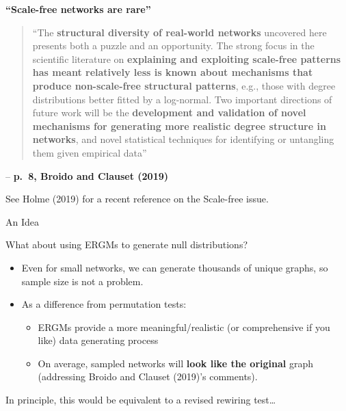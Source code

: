 \documentclass[10pt,ignorenonframetext,aspectratio=169,]{beamer}
\begin{document}
\begin{frame}

\textbf{``Scale-free networks are rare''}

\begin{quote}
\Huge``\normalsize The \textbf{structural diversity of real-world
networks} uncovered here presents both a puzzle and an opportunity. The
strong focus in the scientific literature on \textbf{explaining and
exploiting scale-free patterns has meant relatively less is known about
mechanisms that produce non-scale-free structural patterns}, e.g., those
with degree distributions better fitted by a log-normal. Two important
directions of future work will be the \textbf{development and validation
of novel mechanisms for generating more realistic degree structure in
networks}, and novel statistical techniques for identifying or
untangling them given empirical data\Huge''\normalsize
\end{quote}

\raggedleft

-- \textbf{p.~8, Broido and Clauset (2019)}

\raggedright

See Holme (2019) for a recent reference on the Scale-free issue.

\end{frame}

\begin{frame}{An Idea}
\protect\hypertarget{an-idea}{}

What about using ERGMs to generate null distributions?\pause

\begin{itemize}
\item
  Even for small networks, we can generate thousands of unique graphs,
  so sample size is not a problem.\pause
\item
  As a difference from permutation tests:\pause

  \begin{itemize}
  \item
    ERGMs provide a more meaningful/realistic (or comprehensive if you
    like) data generating process\pause
  \item
    On average, sampled networks will \textbf{look like the original}
    graph (addressing Broido and Clauset (2019)'s comments).\pause
  \end{itemize}
\end{itemize}

In principle, this would be equivalent to a revised rewiring
test\ldots{}

\end{frame}
\end{document}
